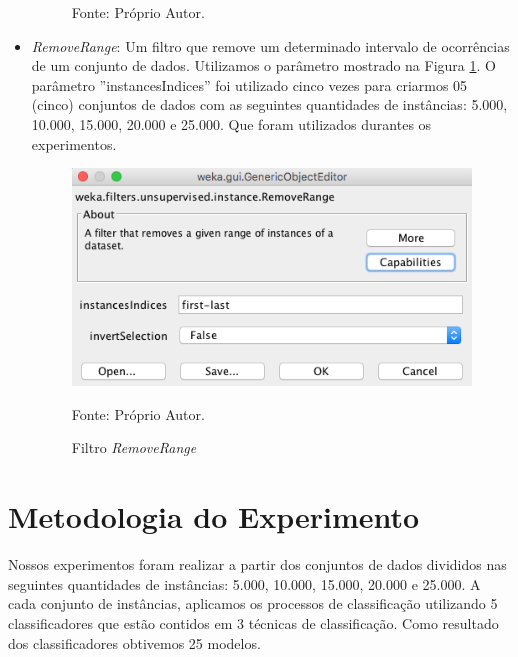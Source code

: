 \documentclass[
	12pt,				%
	openright,			%
	oneside,	
	a4paper,				%
	english,				%
	brazil				%
]{abntex2/abntex2} %
\begin{document}
\begin{itemize}
\begin{figure}[!h]
\begin{center}
				\end{center}
				\centering Fonte: Próprio Autor.
			\end{figure}
			\newpage
			\item \textit{RemoveRange}: Um filtro que remove um determinado intervalo de ocorrências de um conjunto de dados. Utilizamos o parâmetro mostrado na Figura \ref{figfiltroRemoveRange}. O parâmetro ''instancesIndices''  foi utilizado cinco vezes para criarmos 05 (cinco) conjuntos de dados com as seguintes quantidades de instâncias: 5.000, 10.000, 15.000, 20.000 e 25.000. Que foram utilizados durantes os experimentos.
			\begin{figure}[!h]
					\caption{\label{figfiltroRemoveRange} Filtro \textit{RemoveRange}}
				\begin{center}
					\includegraphics[scale=0.45]{img/filtroRemoveRange.png}
				\end{center}
			\centering Fonte: Próprio Autor.
			\end{figure}
		\end{itemize}

		
	\section{Metodologia do Experimento}
	
	Nossos experimentos foram realizar a partir dos conjuntos de dados divididos nas seguintes quantidades de instâncias: 5.000, 10.000, 15.000, 20.000 e 25.000. A cada conjunto de instâncias, aplicamos os processos de classificação utilizando 5 classificadores que estão contidos em 3 técnicas de classificação. Como resultado dos classificadores obtivemos 25 modelos. 
	
\end{document}
